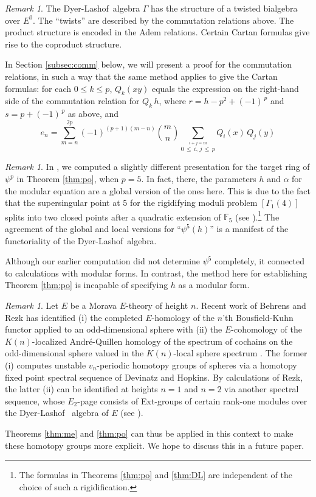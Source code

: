 \documentclass{gtpart}
\theoremstyle{definition}
\theoremstyle{remark}
\newtheorem{rmk}[equation]{Remark}
\newcommand{\mb}[1]{\mathbb{#1}}
\newcommand{\DL}{Dyer-Lashof~}
\newcommand{\BF}{{\mb F}}
\newcommand{\A}{\alpha}
\newcommand{\G}{\Gamma}
\renewcommand{\=}{\approx}
\renewcommand{\-}{\sim}
\newcommand{\ch}[2]{{#1 \choose #2}}
\numberwithin{equation}{section}
\begin{document}
\begin{rmk}
 The \DL algebra $\G$ has the structure of a twisted bialgebra over $E^0$.  The 
 ``twists'' are described by the commutation relations above.  The product 
 structure is encoded in the Adem relations.  Certain Cartan formulas give rise 
 to the coproduct structure.  

 In Section \ref{subsec:comm} below, we will present a proof for the commutation 
 relations, in such a way that the same method applies to give the Cartan 
 formulas: for each $0 \leq k \leq p$, $Q_k(x y)$ equals the expression on the 
 right-hand side of the commutation relation for $Q_k \, h$, where 
 $r = h - p^2 + (-1)^{\,p}$ and $s = p + (-1)^{\,p}$ as above, and 
 \[
  e_n = \sum_{m = n}^{2 p} (-1)^{(p + 1) (m - n)} \ch{m}{n} 
  \sum_{\stackrel{\scriptstyle i + j = m}{0 \,\leq\, i, \, j \,\leq\, p}} 
  Q_i(x) \, Q_j(y) 
 \]
\end{rmk}

\begin{rmk}
 In \cite[Example 3.5]{ho}, we computed a slightly different presentation for 
 the target ring of $\psi^p$ in Theorem \ref{thm:po}, when $p = 5$.  In fact, 
 there, the parameters $h$ and $\A$ for the modular equation are a global 
 version of the ones here.  This is due to the fact that the supersingular point 
 at 5 for the rigidifying moduli problem $[\G_1(4)]$ splits into two closed 
 points after a quadratic extension of $\BF_5$ (see 
 \cite[Example 2.6]{ho}).\footnote{The formulas in Theorems \ref{thm:po} and 
 \ref{thm:DL} are independent of the choice of such a rigidification.  }  The 
 agreement of the global and local versions for ``$\psi^5(h)$'' is a manifest of 
 the functoriality of the \DL algebra.  

 Although our earlier computation did not determine $\psi^5$ completely, it 
 connected to calculations with modular forms.  In contrast, the method here for 
 establishing Theorem \ref{thm:po} is incapable of specifying $h$ as a modular 
 form.  
\end{rmk}

\begin{rmk}
 Let $E$ be a Morava $E$-theory of height $n$.  Recent work of Behrens and Rezk 
 has identified (i) the completed $E$-homology of the $n$'th Bousfield-Kuhn 
 functor applied to an odd-dimensional sphere with (ii) the $E$-cohomology of 
 the $K(n)$-localized Andr\'e-Quillen homology of the spectrum of cochains on 
 the odd-dimensional sphere valued in the $K(n)$-local sphere spectrum 
 \cite[Theorem 8.1]{BKTAQ}.  The former (i) computes unstable $v_n$-periodic 
 homotopy groups of spheres via a homotopy fixed point spectral sequence of 
 Devinatz and Hopkins.  By calculations of Rezk, the latter (ii) can be 
 identified at heights $n = 1$ and $n = 2$ via another spectral sequence, whose 
 $E_2$-page consists of Ext-groups of certain rank-one modules over the \DL 
 algebra of $E$ (see \cite[Example 2.13]{h2}).  

 Theorems \ref{thm:me} and \ref{thm:po} can thus be applied in this context to 
 make these homotopy groups more explicit.  We hope to discuss this in a future 
 paper.  
\end{rmk}
\end{document}
